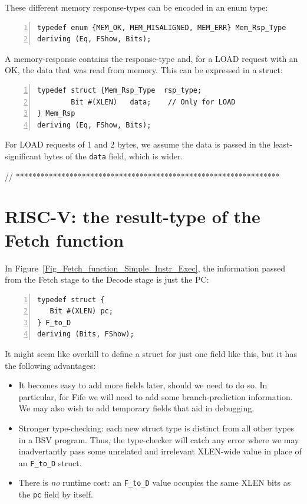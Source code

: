These different memory response-types can be encoded in an enum type:

\begin{Verbatim}[frame=single, numbers=left]
typedef enum {MEM_OK, MEM_MISALIGNED, MEM_ERR} Mem_Rsp_Type
deriving (Eq, FShow, Bits);
\end{Verbatim}

A memory-response contains the response-type and, for a LOAD request
with an OK, the data that was read from memory.  This can be expressed
in a struct:

\begin{Verbatim}[frame=single, numbers=left]
typedef struct {Mem_Rsp_Type  rsp_type;
		Bit #(XLEN)   data;    // Only for LOAD
} Mem_Rsp
deriving (Eq, FShow, Bits);
\end{Verbatim}

For LOAD requests of 1 and 2 bytes, we assume the data is passed in
the least-significant bytes of the \verb|data| field, which is wider.

// ****************************************************************

\section{RISC-V: the result-type of the Fetch function}

In Figure~\ref{Fig_Fetch_function_Simple_Instr_Exec}, the information
passed from the Fetch stage to the Decode stage is just the PC:

\begin{Verbatim}[frame=single, numbers=left]
typedef struct {
   Bit #(XLEN) pc;
} F_to_D
deriving (Bits, FShow);
\end{Verbatim}


It might seem like overkill to define a struct for just one field like
this, but it has the following advantages:

\begin{itemize}

  \item It becomes easy to add more fields later, should we need to do
    so.  In particular, for Fife we will need to add some
    branch-prediction information.  We may also wish to add temporary
    fields that aid in debugging.

  \item Stronger type-checking: each new struct type is distinct from
    all other types in a BSV program.  Thus, the type-checker will
    catch any error where we may inadvertantly pass some unrelated and
    irrelevant XLEN-wide value in place of an \verb|F_to_D| struct.

  \item There is \emph{no} runtime cost: an \verb|F_to_D| value
    occupies the same XLEN bits as the \verb|pc| field by itself.

\end{itemize}

